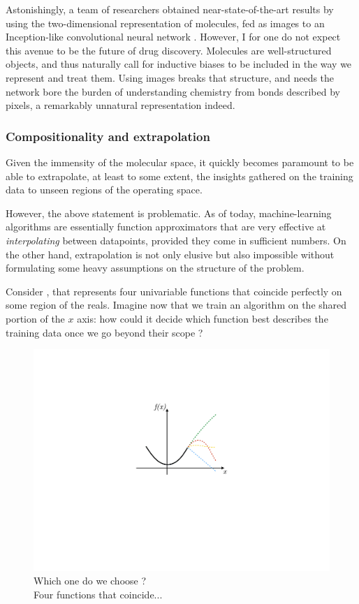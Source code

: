 \documentclass[11pt]{article}
\numberwithin{equation}{subsection}
\begin{document}
Astonishingly, a team of researchers obtained near-state-of-the-art results by using the two-dimensional representation of molecules, fed as images to an Inception-like convolutional neural network \citep{goh2017chemception}. However, I for one do not expect this avenue to be the future of drug discovery. Molecules are well-structured objects, and thus naturally call for inductive biases to be included in the way we represent and treat them. Using images breaks that structure, and needs the network bore the burden of understanding chemistry from bonds described by pixels, a remarkably unnatural representation indeed.


\subsubsection{Compositionality and extrapolation}

Given the immensity of the molecular space, it quickly becomes paramount to be able to extrapolate, at least to some extent, the insights gathered on the training data to unseen regions of the operating space.

However, the above statement is problematic. As of today, machine-learning algorithms are essentially function approximators that are very effective at \textit{interpolating} between datapoints, provided they come in sufficient numbers. On the other hand, extrapolation is not only elusive but also impossible without formulating some heavy assumptions on the structure of the problem.

Consider , that represents four univariable functions that coincide perfectly on some region of the reals. Imagine now that we train an algorithm on the shared portion of the $x$ axis: how could it decide which function best describes the training data once we go beyond their scope ?

\begin{figure}[ht]
  \includegraphics[width=.4\textwidth,center]{extrapolation}
  \caption{Which one do we choose ?\\Four functions that coincide...}
  \label{fig:extrapolation}
\end{figure}
\end{document}

